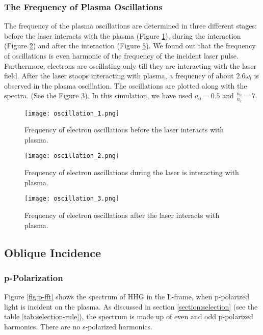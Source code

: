 \subsubsection{The Frequency of Plasma Oscillations}
The frequency of the plasma oscillations are determined in three different stages: before the laser interacts with the plasma (Figure \ref{fig:oscillation_1}), during the interaction (Figure \ref{fig:oscillation_2}) and after the interaction (Figure \ref{fig:oscillation_3}). We found out that the frequency of oscillations is even harmonic of the frequency of the incident laser pulse. Furthermore, electrons are oscillating only till they are interacting with the laser field. After the laser staops interacting with plasma, a frequency of about $2.6\omega_l$ is observed in the plasma oscillation. The oscillations are plotted along with the spectra. (See the Figure \ref{fig:oscillation_3}). In this simulation, we have used $a_0 = 0.5$ and $\frac{n_0}{n_c} = 7$.

\begin{figure}[H]
    \centering
    \texttt{[image: oscillation\_1.png]}
    \caption{Frequency of electron oscillations before the laser interacts with plasma.}
    \label{fig:oscillation_1}
\end{figure}

\begin{figure}[h]
    \centering
    \texttt{[image: oscillation\_2.png]}
    \caption{Frequency of electron oscillations during the laser is interacting with plasma.}
    \label{fig:oscillation_2}
\end{figure}

\begin{figure}[h]
    \centering
    \texttt{[image: oscillation\_3.png]}
    \caption{Frequency of electron oscillations after the laser interacts with plasma.}
    \label{fig:oscillation_3}
\end{figure}

\subsection{Oblique Incidence}

\subsubsection{p-Polarization}
Figure \ref{fig:p-fft} shows the spectrum of HHG in the L-frame, when p-polarized light is incident on the plasma. As discussed in section \ref{section:selection} (see the table \ref{tab:selection-rule}), the spectrum is made up of even and odd p-polarized harmonics. There are no s-polarized harmonics.

